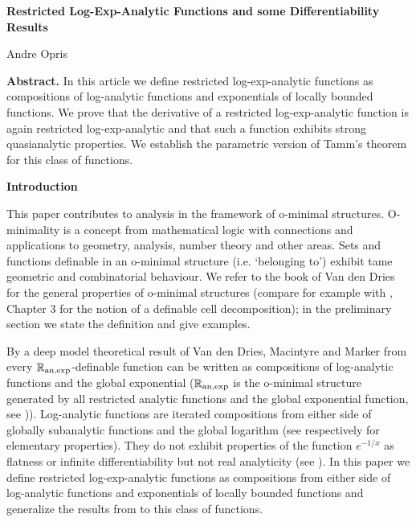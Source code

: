 \documentclass[12pt]{article}
\def\vs{\vspace}
\begin{document}
\begin{center}
{\Large\bf Restricted Log-Exp-Analytic Functions and some Differentiability Results}

\vs{0.3cm}
Andre Opris
\end{center}
	

\vs{0.2cm}
{\small {\bf Abstract.} In this article we define restricted log-exp-analytic functions as compositions of log-analytic functions and exponentials of locally bounded functions. We prove that the derivative of a restricted log-exp-analytic function is again restricted log-exp-analytic and that such a function exhibits strong quasianalytic properties. We establish the parametric version of Tamm’s theorem for this class of functions.}

\vs{0.7cm}
{\Large\bf Introduction}

\vs{0.2cm}
This paper contributes to analysis in the framework of o-minimal structures. O-minimality is a concept from mathematical logic with connections and applications to geometry, analysis, number theory and other areas. Sets and functions definable in an o-minimal structure (i.e. ‘belonging to’) exhibit tame geometric and combinatorial behaviour. We refer to the book of Van den Dries \cite{3} for the general properties of o-minimal structures (compare for example with \cite{3}, Chapter 3 for the notion of a definable cell decomposition); in the preliminary section we state the definition and give examples.

\vs{0.1cm}
By a deep model theoretical result of Van den Dries, Macintyre and Marker from \cite{4} every $\mathbb{R}_{\textnormal{an,exp}}$-definable function can be written as compositions of log-analytic functions and the global exponential ($\mathbb{R}_{\textnormal{an,exp}}$ is the o-minimal structure generated by all restricted analytic functions and the global exponential function, see \cite{2})). Log-analytic functions are iterated compositions from either side of globally subanalytic functions and the global logarithm (see \cite{7} respectively \cite{10} for elementary properties). They do not exhibit properties of the function $e^{-1/x}$ as flatness or infinite differentiability but not real analyticity (see \cite{7}). In this paper we define restricted log-exp-analytic functions as compositions from either side of log-analytic functions and exponentials of locally bounded functions and generalize the results from \cite{7} to this class of functions. 
\end{document}
